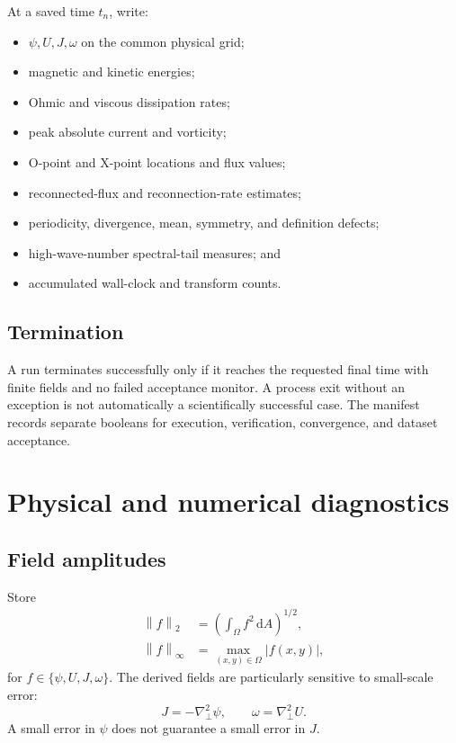 \documentclass[11pt]{article}
\newcommand{\dd}{\mathrm{d}}
\newcommand{\Lap}{\nabla_{\!\perp}^{2}}
\newcommand{\norm}[1]{\left\lVert #1\right\rVert}
\begin{document}
At a saved time $t_n$, write:
\begin{itemize}
  \item $\psi,U,J,\omega$ on the common physical grid;
  \item magnetic and kinetic energies;
  \item Ohmic and viscous dissipation rates;
  \item peak absolute current and vorticity;
  \item O-point and X-point locations and flux values;
  \item reconnected-flux and reconnection-rate estimates;
  \item periodicity, divergence, mean, symmetry, and definition defects;
  \item high-wave-number spectral-tail measures; and
  \item accumulated wall-clock and transform counts.
\end{itemize}

\subsection{Termination}

A run terminates successfully only if it reaches the requested final time with finite fields and no failed acceptance monitor. A process exit without an exception is not automatically a scientifically successful case. The manifest records separate booleans for execution, verification, convergence, and dataset acceptance.

\section{Physical and numerical diagnostics}
\label{sec:diagnostics}

\subsection{Field amplitudes}

Store
\begin{align}
\norm{f}_2
&=\left(\int_\Omega f^2\,\dd A\right)^{1/2},\\
\norm{f}_\infty
&=\max_{(x,y)\in\Omega}|f(x,y)|,
\end{align}
for $f\in\{\psi,U,J,\omega\}$. The derived fields are particularly sensitive to small-scale error:
\begin{equation}
J=-\Lap\psi,
\qquad
\omega=\Lap U.
\end{equation}
A small error in $\psi$ does not guarantee a small error in $J$.
\end{document}
